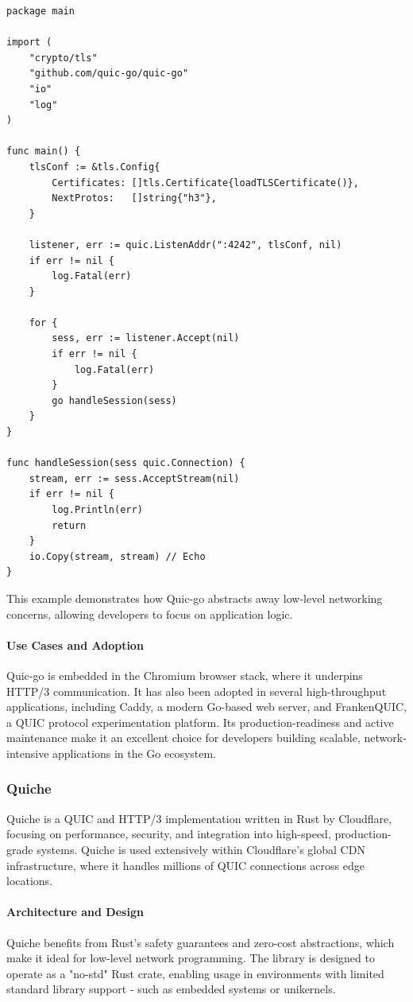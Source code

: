 \begin{lstlisting}[breaklines=true,basicstyle=\small\ttfamily,frame=single]
package main

import (
    "crypto/tls"
    "github.com/quic-go/quic-go"
    "io"
    "log"
)

func main() {
    tlsConf := &tls.Config{
        Certificates: []tls.Certificate{loadTLSCertificate()},
        NextProtos:   []string{"h3"},
    }

    listener, err := quic.ListenAddr(":4242", tlsConf, nil)
    if err != nil {
        log.Fatal(err)
    }

    for {
        sess, err := listener.Accept(nil)
        if err != nil {
            log.Fatal(err)
        }
        go handleSession(sess)
    }
}

func handleSession(sess quic.Connection) {
    stream, err := sess.AcceptStream(nil)
    if err != nil {
        log.Println(err)
        return
    }
    io.Copy(stream, stream) // Echo
}
\end{lstlisting}

This example demonstrates how Quic-go abstracts away low-level networking concerns, allowing developers to focus on application logic.

\paragraph{Use Cases and Adoption}
Quic-go is embedded in the Chromium browser stack, where it underpins HTTP/3 communication. It has also been adopted in several high-throughput applications, including Caddy, a modern Go-based web server, and FrankenQUIC, a QUIC protocol experimentation platform. Its production-readiness and active maintenance make it an excellent choice for developers building scalable, network-intensive applications in the Go ecosystem.

\subsubsection{Quiche}
Quiche is a QUIC and HTTP/3 implementation written in Rust by Cloudflare, focusing on performance, security, and integration into high-speed, production-grade systems. Quiche is used extensively within Cloudflare's global CDN infrastructure, where it handles millions of QUIC connections across edge locations.

\paragraph{Architecture and Design}
Quiche benefits from Rust's safety guarantees and zero-cost abstractions, which make it ideal for low-level network programming. The library is designed to operate as a "no-std" Rust crate, enabling usage in environments with limited standard library support - such as embedded systems or unikernels.

